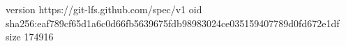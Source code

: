 version https://git-lfs.github.com/spec/v1
oid sha256:eaf789cf65d1a6c0d66fb5639675fdb98983024ce035159407789d0fd672e1df
size 174916
